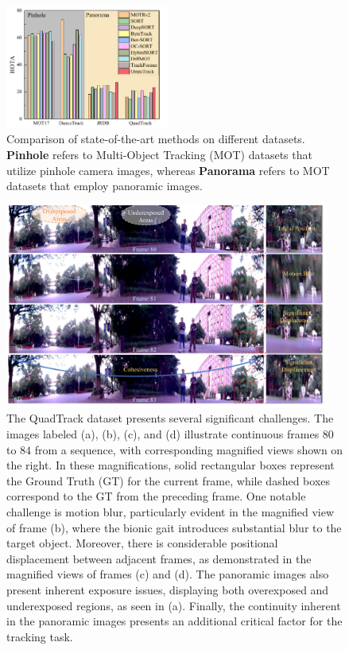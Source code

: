 \begin{figure}[!t]
  \centering
  \includegraphics[width=0.48\textwidth]{imgs/SOTA_v2.pdf}
  \caption{Comparison of state-of-the-art methods on different datasets. \textbf{Pinhole} refers to Multi-Object Tracking (MOT) datasets that utilize pinhole camera images, whereas \textbf{Panorama} refers to MOT datasets that employ panoramic images.}
  \label{fig:SOTA}
\end{figure}



\begin{figure}[!t]
  \centering
  \includegraphics[width=0.95\textwidth]{imgs/quadtrack_challenge_v1.pdf}
  \caption{The QuadTrack dataset presents several significant challenges. The images labeled (a), (b), (c), and (d) illustrate continuous frames $80$ to $84$ from a sequence, with corresponding magnified views shown on the right. In these magnifications, solid rectangular boxes represent the Ground Truth (GT) for the current frame, while dashed boxes correspond to the GT from the preceding frame. One notable challenge is motion blur, particularly evident in the magnified view of frame (b), where the bionic gait introduces substantial blur to the target object. Moreover, there is considerable positional displacement between adjacent frames, as demonstrated in the magnified views of frames (c) and (d). The panoramic images also present inherent exposure issues, displaying both overexposed and underexposed regions, as seen in (a). Finally, the continuity inherent in the panoramic images presents an additional critical factor for the tracking task.}
  \label{fig:challenge}
\end{figure}
